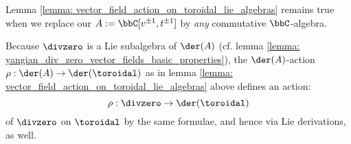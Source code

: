         \begin{remark}
            Lemma \ref{lemma: vector_field_action_on_toroidal_lie_algebras} remains true when we replace our $A := \bbC[v^{\pm 1}, t^{\pm 1}]$ by \textit{any} commutative $\bbC$-algebra.
        \end{remark}
        \begin{corollary} \label{coro: a_fixed_yangian_div_zero_vector_field_action} 
            Because $\divzero$ is a Lie subalgebra of $\der(A)$ (cf. lemma \ref{lemma: yangian_div_zero_vector_fields_basic_properties}), the $\der(A)$-action $\rho: \der(A) \to \der(\toroidal)$ as in lemma \ref{lemma: vector_field_action_on_toroidal_lie_algebras} above defines an action:
                $$\rho: \divzero \to \der(\toroidal)$$
            of $\divzero$ on $\toroidal$ by the same formulae, and hence via Lie derivations, as well.
        \end{corollary}
            
